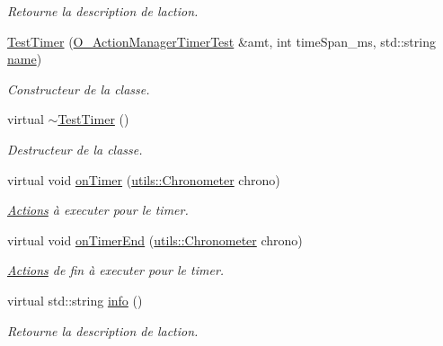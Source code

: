 \begin{DoxyCompactItemize}
\begin{DoxyCompactList}\small\item\em Retourne la description de l\textquotesingle{}action. \end{DoxyCompactList}\item 
\hyperlink{classTestTimer_a7bd3bc501eab8acb36c03dffc677bf32}{Test\+Timer} (\hyperlink{classO__ActionManagerTimerTest}{O\+\_\+\+Action\+Manager\+Timer\+Test} \&amt, int time\+Span\+\_\+ms, std\+::string \hyperlink{classITimerPosixListener_a56abc90e01e315320b855399b2c0096e}{name})
\begin{DoxyCompactList}\small\item\em Constructeur de la classe. \end{DoxyCompactList}\item 
\mbox{\label{classTestTimer_a9f6f53116d251719b18e36f2341fd657}} 
virtual \hyperlink{classTestTimer_a9f6f53116d251719b18e36f2341fd657}{$\sim$\+Test\+Timer} ()
\begin{DoxyCompactList}\small\item\em Destructeur de la classe. \end{DoxyCompactList}\item 
\mbox{\label{classTestTimer_a70a8065acddb860146efb3ecfae222b3}} 
virtual void \hyperlink{classTestTimer_a70a8065acddb860146efb3ecfae222b3}{on\+Timer} (\hyperlink{classutils_1_1Chronometer}{utils\+::\+Chronometer} chrono)
\begin{DoxyCompactList}\small\item\em \hyperlink{classActions}{Actions} à executer pour le timer. \end{DoxyCompactList}\item 
\mbox{\label{classTestTimer_abe57536b3dfa9cc7075fddfaf957e0e3}} 
virtual void \hyperlink{classTestTimer_abe57536b3dfa9cc7075fddfaf957e0e3}{on\+Timer\+End} (\hyperlink{classutils_1_1Chronometer}{utils\+::\+Chronometer} chrono)
\begin{DoxyCompactList}\small\item\em \hyperlink{classActions}{Actions} de fin à executer pour le timer. \end{DoxyCompactList}\item 
\mbox{\label{classTestTimer_a304cc842e688910a2e05b38e69d6e329}} 
virtual std\+::string \hyperlink{classTestTimer_a304cc842e688910a2e05b38e69d6e329}{info} ()
\begin{DoxyCompactList}\small\item\em Retourne la description de l\textquotesingle{}action. \end{DoxyCompactList}\end{DoxyCompactItemize}
